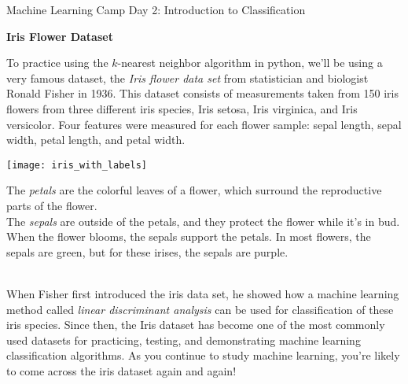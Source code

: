 \documentclass[10pt]{article}
\newcommand{\headerclass}{Machine Learning Camp}
\newcommand{\headersection}{Day 2: Introduction to Classification}
\newcommand{\headertitle}{Iris Flower Dataset}
\begin{document}
\headerclass\xspace {} \headersection\\
\begin{center}{ \large \textbf{\headertitle} }\end{center}

To practice using the $k$-nearest neighbor algorithm in python, we'll be using a very famous dataset, the \emph{Iris flower data set} from statistician and biologist Ronald Fisher in 1936. This dataset consists of measurements taken from 150 iris flowers from three different iris species, Iris setosa, Iris virginica, and Iris versicolor. Four features were measured for each flower sample: sepal length, sepal width, petal length, and petal width.\\

\begin{minipage}{.5\textwidth}
\begin{center}
\texttt{[image: iris\_with\_labels]}
\end{center}
\end{minipage}
\begin{minipage}{.5\textwidth}
The \emph{petals} are the colorful leaves of a flower, which surround the reproductive parts of the flower.\\

The \emph{sepals} are outside of the petals, and they protect the flower while it's in bud. When the flower blooms, the sepals support the petals. In most flowers, the sepals are green, but for these irises, the sepals are purple.
\end{minipage}\\

When Fisher first introduced the iris data set, he showed how a machine learning method called \emph{linear discriminant analysis} can be used for classification of these iris species. Since then, the Iris dataset has become one of the most commonly used datasets for practicing, testing, and demonstrating machine learning classification algorithms. As you continue to study machine learning, you're likely to come across the iris dataset again and again!
\end{document}

